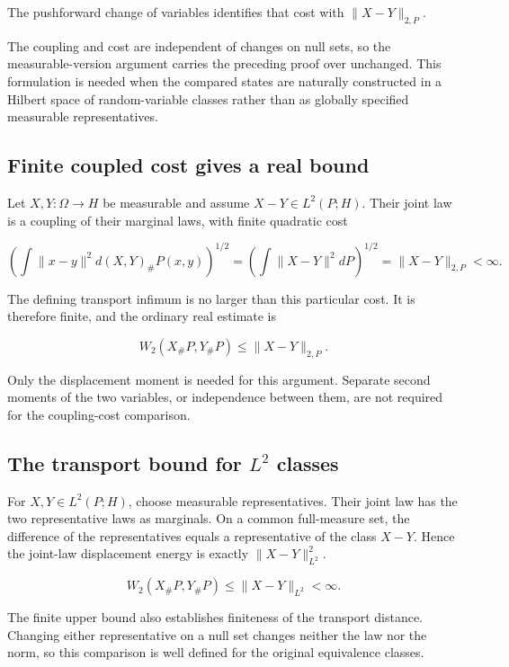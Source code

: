 \documentclass[11pt,a4paper]{report}
\begin{document}
The pushforward change of variables identifies that cost with \(\|X-Y\|_{2,P}\).



The coupling and cost are independent of changes on null sets, so the measurable-version argument carries the preceding proof over unchanged. This formulation is needed when the compared states are naturally constructed in a Hilbert space of random-variable classes rather than as globally specified measurable representatives.

\subsection{\texorpdfstring{Finite coupled cost gives a real bound}{Finite coupled cost gives a real bound}}
\label{report-step-UnadjustedLangevin-Coupling-lean-11}


Let \(X,Y:\Omega\to H\) be measurable and assume \(X-Y\in L^2(P;H)\). Their joint law is a coupling of their marginal laws, with finite quadratic cost

\[\left(\int\|x-y\|^2d(X,Y)_\#P(x,y)\right)^{1/2}
=\left(\int\|X-Y\|^2dP\right)^{1/2}=\|X-Y\|_{2,P}<\infty.\]


The defining transport infimum is no larger than this particular cost. It is therefore finite, and the ordinary real estimate is

\[W_2(X_\#P,Y_\#P)\le\|X-Y\|_{2,P}.\]


Only the displacement moment is needed for this argument. Separate second moments of the two variables, or independence between them, are not required for the coupling-cost comparison.

\subsection{\texorpdfstring{The transport bound for \(L^2\) classes}{The transport bound for L² classes}}
\label{report-step-UnadjustedLangevin-Coupling-lean-12}


For \(X,Y\in L^2(P;H)\), choose measurable representatives. Their joint law has the two representative laws as marginals. On a common full-measure set, the difference of the representatives equals a representative of the class \(X-Y\). Hence the joint-law displacement energy is exactly \(\|X-Y\|_{L^2}^2\).

\[W_2(X_\#P,Y_\#P)\le\|X-Y\|_{L^2}<\infty.\]


The finite upper bound also establishes finiteness of the transport distance. Changing either representative on a null set changes neither the law nor the norm, so this comparison is well defined for the original equivalence classes.
\end{document}
